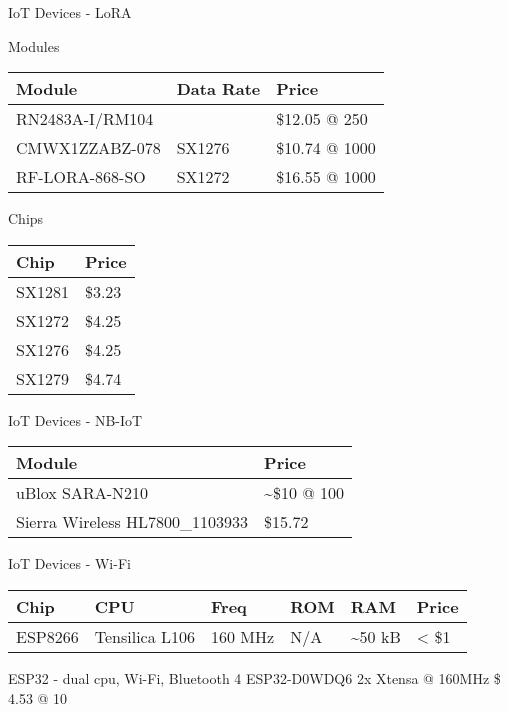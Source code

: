 \begin{frame}{IoT Devices - LoRA}
\protect\hypertarget{iot-devices---lora}{}

\begin{block}{Modules}

\begin{longtable}[]{@{}lll@{}}
\toprule
Module & Data Rate & Price\tabularnewline
\midrule
\endhead
RN2483A-I/RM104 & & \$12.05 @ 250\tabularnewline
CMWX1ZZABZ-078 & SX1276 & \$10.74 @ 1000\tabularnewline
RF-LORA-868-SO & SX1272 & \$16.55 @ 1000\tabularnewline
\bottomrule
\end{longtable}

\end{block}

\begin{block}{Chips}

\begin{longtable}[]{@{}ll@{}}
\toprule
Chip & Price\tabularnewline
\midrule
\endhead
SX1281 & \$3.23\tabularnewline
SX1272 & \$4.25\tabularnewline
SX1276 & \$4.25\tabularnewline
SX1279 & \$4.74\tabularnewline
\bottomrule
\end{longtable}


\end{block}

\end{frame}

\begin{frame}{IoT Devices - NB-IoT}
\protect\hypertarget{iot-devices---nb-iot}{}

\begin{longtable}[]{@{}ll@{}}
\toprule
Module & Price\tabularnewline
\midrule
\endhead
uBlox SARA-N210 & \textasciitilde{}\$10 @ 100\tabularnewline
Sierra Wireless HL7800\_1103933 & \$15.72\tabularnewline
\bottomrule
\end{longtable}

\end{frame}

\begin{frame}{IoT Devices - Wi-Fi}
\protect\hypertarget{iot-devices---wi-fi}{}

\begin{longtable}[]{@{}llllll@{}}
\toprule
Chip & CPU & Freq & ROM & RAM & Price\tabularnewline
\midrule
\endhead
ESP8266 & Tensilica L106 & 160 MHz & N/A & \textasciitilde{}50 kB &
\textless{} \$1\tabularnewline
\bottomrule
\end{longtable}

ESP32 - dual cpu, Wi-Fi, Bluetooth 4 ESP32-D0WDQ6 2x Xtensa @ 160MHz \$
4.53 @ 10


\end{frame}

